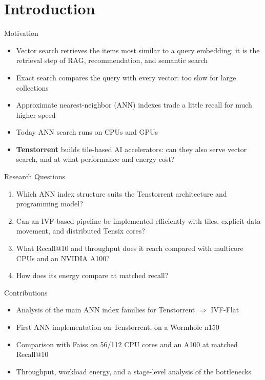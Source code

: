 \section{Introduction}

\begin{frame}{Motivation}
  \begin{itemize}
    \item Vector search retrieves the items most similar to a query embedding: it is the retrieval step of RAG, recommendation, and semantic search
    \item Exact search compares the query with every vector: too slow for large collections
    \item Approximate nearest-neighbor (ANN) indexes trade a little recall for much higher speed
    \item Today ANN search runs on CPUs and GPUs
    \item \textbf{Tenstorrent} builds tile-based AI accelerators: can they also serve vector search, and at what performance and energy cost?
  \end{itemize}
\end{frame}

\begin{frame}{Research Questions}
  \begin{enumerate}
    \item Which ANN index structure suits the Tenstorrent architecture and programming model?
    \item Can an IVF-based pipeline be implemented efficiently with tiles, explicit data movement, and distributed Tensix cores?
    \item What Recall@10 and throughput does it reach compared with multicore CPUs and an NVIDIA A100?
    \item How does its energy compare at matched recall?
  \end{enumerate}
\end{frame}

\begin{frame}{Contributions}
  \begin{itemize}
    \item Analysis of the main ANN index families for Tenstorrent $\Rightarrow$ IVF-Flat
    \item First ANN implementation on Tenstorrent, on a Wormhole n150
    \item Comparison with Faiss on 56/112 CPU cores and an A100 at matched Recall@10
    \item Throughput, workload energy, and a stage-level analysis of the bottlenecks
  \end{itemize}
\end{frame}
